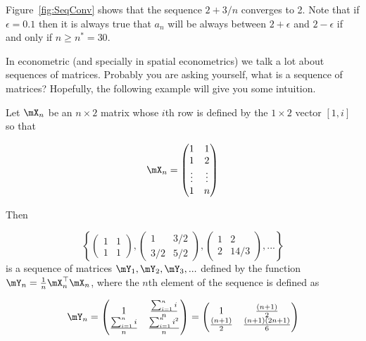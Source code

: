 \documentclass[english,12pt]{book}\usepackage[]{graphicx}\usepackage[]{xcolor}
\begin{document}
Figure~\ref{fig:SeqConv} shows that the sequence $2 + 3/n$ converges to 2. Note that if $\epsilon = 0.1$ then it is always true that $a_n$ will be always between $2 + \epsilon$ and $2 - \epsilon$ if and only if $n \geq n^*= 30$.

In econometric (and specially in spatial econometrics) we talk a lot about sequences of matrices. Probably you are asking yourself, what is a sequence of matrices? Hopefully, the following example will give you some intuition. 

\begin{example}\label{example:sequence_matrix}
Let $\mX_n$ be an $n\times 2$ matrix whose $i$th row is defined by the $1\times 2$ vector $\left[1, i\right]$ so that

\begin{equation*}
\mX_n = \begin{pmatrix}
  1 & 1 \\
  1 & 2 \\
  \vdots & \vdots\\
  1 & n
\end{pmatrix}
\end{equation*}

Then

\begin{equation*}
\left\lbrace \begin{pmatrix}
1 & 1\\
1 & 1
\end{pmatrix},
\begin{pmatrix}
  1 & 3/2 \\
  3/2 & 5/2
\end{pmatrix},
\begin{pmatrix}
1 & 2 \\
2 & 14/3
\end{pmatrix}, ...
\right\rbrace
\end{equation*}
%
is a sequence of matrices $\mY_1, \mY_2, \mY_3,...$ defined by the function $\mY_n = \frac{1}{n}\mX_n^\top\mX_n$, where the $n$th element of the sequence is defined as

\begin{equation*}
\mY_n = \begin{pmatrix}
1 & \frac{\sum_{i = 1}^n i}{n} \\
\frac{\sum_{i = 1}^n i}{n} & \frac{\sum_{i = 1}^n i^2}{n}
\end{pmatrix} = 
\begin{pmatrix}
1 & \frac{(n + 1)}{2} \\
\frac{(n + 1)}{2}& \frac{(n +1)(2n +1)}{6}
\end{pmatrix}
\end{equation*}
\end{example}
\end{document}
